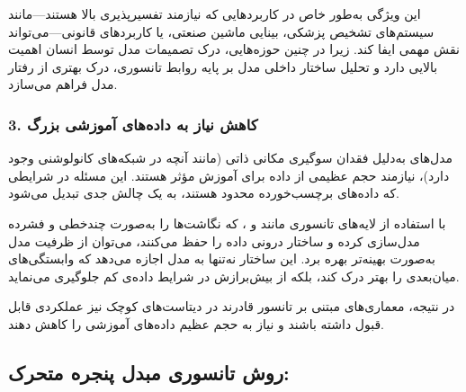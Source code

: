 این ویژگی به‌طور خاص در کاربردهایی که نیازمند تفسیرپذیری بالا هستند—مانند سیستم‌های تشخیص پزشکی، بینایی ماشین صنعتی، یا کاربردهای قانونی—می‌تواند نقش مهمی ایفا کند. زیرا در چنین حوزه‌هایی، درک تصمیمات مدل توسط انسان اهمیت بالایی دارد و تحلیل ساختار داخلی مدل بر پایه روابط تانسوری، درک بهتری از رفتار مدل فراهم می‌سازد.


\subsubsection*{3. \textbf{کاهش نیاز به داده‌های آموزشی بزرگ}}

مدل‌های  به‌دلیل فقدان سوگیری مکانی ذاتی (مانند آنچه در شبکه‌های کانولوشنی وجود دارد)، نیازمند حجم عظیمی از داده برای آموزش مؤثر هستند. این مسئله در شرایطی که داده‌های برچسب‌خورده محدود هستند، به یک چالش جدی تبدیل می‌شود.

با استفاده از لایه‌های تانسوری مانند  و ، که نگاشت‌ها را به‌صورت چندخطی و فشرده مدل‌سازی کرده و ساختار درونی داده را حفظ می‌کنند، می‌توان از ظرفیت مدل به‌صورت بهینه‌تر بهره برد. این ساختار نه‌تنها به مدل اجازه می‌دهد که وابستگی‌های میان‌بعدی را بهتر درک کند، بلکه از بیش‌برازش در شرایط داده‌ی کم جلوگیری می‌نماید.

در نتیجه، معماری‌های مبتنی بر تانسور قادرند در دیتاست‌های کوچک نیز عملکردی قابل قبول داشته باشند و نیاز به حجم عظیم داده‌های آموزشی را کاهش دهند.



\subsection{روش تانسوری مبدل پنجره متحرک:}











